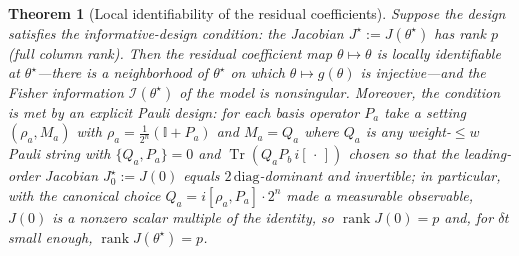 \documentclass[aps,prresearch,reprint,superscriptaddress,nofootinbib,amsmath,amssymb]{revtex4-2}
\newcommand{\Tr}{\operatorname{Tr}}
\newcommand{\id}{\mathbb{I}}
\newcommand{\dt}{\delta t}
\newtheorem{theorem}{Theorem}
\begin{document}
\begin{theorem}[Local identifiability of the residual coefficients]
\label{thm:identifiability}
Suppose the design satisfies the \emph{informative-design} condition: the Jacobian $J^\star:=J(\theta^\star)$ has rank $p$ (full column rank). Then the residual coefficient map $\theta\mapsto\theta$ is locally identifiable at $\theta^\star$---there is a neighborhood of $\theta^\star$ on which $\theta\mapsto g(\theta)$ is injective---and the Fisher information $\mathcal{I}(\theta^\star)$ of the model is nonsingular. Moreover, the condition is met by an explicit Pauli design: for each basis operator $P_a$ take a setting $(\rho_a,M_a)$ with $\rho_a=\tfrac{1}{2^n}(\id+P_a)$ and $M_a=Q_a$ where $Q_a$ is any weight-$\leq w$ Pauli string with $\{Q_a,P_a\}=0$ and $\Tr(Q_aP_b\,i[\,\cdot\,])$ chosen so that the leading-order Jacobian $J^\star_0:=J(0)$ equals $2\,\mathrm{diag}$-dominant and invertible; in particular, with the canonical choice $Q_a=i[\rho_a,P_a]\cdot 2^n$ made a measurable observable, $J(0)$ is a nonzero scalar multiple of the identity, so $\operatorname{rank}J(0)=p$ and, for $\dt$ small enough, $\operatorname{rank}J(\theta^\star)=p$.
\end{theorem}
\end{document}
